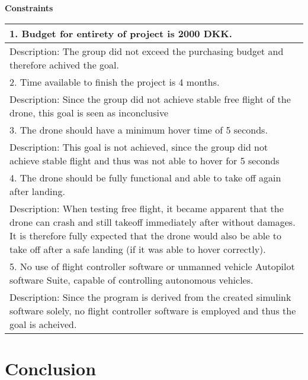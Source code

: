 \begin{center}
  \bigbreak
  \textbf{Constraints} 
  \bigbreak

  \begin{tabular}{| m{33em} |}
      \hline
      \color{ForestGreen}
      1. Budget for entirety of project is 2000 DKK.  \\ 
      \hline
      Description:  The group did not exceed the purchasing budget and therefore achived the goal.\\ 
      \hline
      \hline
      \color{YellowOrange}
      2. Time available to finish the project is 4 months. \\ 
      \hline
      Description:  Since the group did not achieve stable free flight of the drone, this goal is seen as inconclusive\\ 
      \hline
      \hline
      \color{BrickRed}
      3. The drone should have a minimum hover time of 5 
      seconds.\\
      \hline
      Description:   This goal is not achieved, since the group did not achieve stable flight and thus was not able to hover for 5 seconds\\ 
      \hline
      \hline
      \color{ForestGreen}
      4. The drone should be fully functional and able 
      to take off again after landing.\\
      \hline
      Description: When testing free flight, it became apparent that the drone can crash and still takeoff immediately after without damages. It is therefore fully 
      expected that the drone would also be able to take off after a safe landing (if it was able to hover correctly).\\ 
      \hline
      \hline
      \color{ForestGreen}
      5. No use of flight controller software or unmanned 
      vehicle Autopilot software Suite, capable of 
      controlling autonomous vehicles.\\
      \hline
      Description:  Since the program is derived from the created simulink software solely, no flight controller software is employed and thus the goal is acheived. \\ 
      \hline
  \end{tabular}

\end{center}    

\section*{Conclusion}


